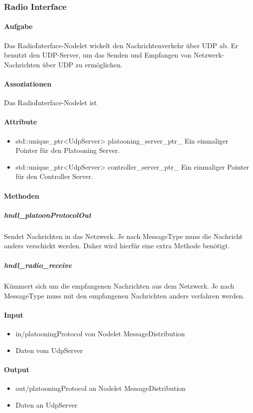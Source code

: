 \documentclass[a4paper, 12pt, titlepage]{scrartcl}
\begin{document}
			\subsubsection{Radio Interface}
			\label{radio_interface}
				\paragraph{Aufgabe} Das RadioInterface-Nodelet wickelt den Nachrichtenverkehr über UDP ab. Er benutzt den UDP-Server, um das Senden und Empfangen von Netzwerk-Nachrichten über UDP zu ermöglichen. 
				\paragraph{Assoziationen} Das RadioInterface-Nodelet ist 
				\paragraph{Attribute}
					\begin{itemize}
					    \item std::unique\_ptr<UdpServer> platooning\_server\_ptr\_ Ein einmaliger Pointer für den Platooning Server. 
					    \item std::unique\_ptr<UdpServer> controller\_server\_ptr\_ Ein einmaliger Pointer für den Controller Server. 
					\end{itemize}
				\paragraph{Methoden}
				    \subparagraph{hndl\_platoonProtocolOut} Sendet Nachrichten in das Netzwerk. Je nach MessageType muss die Nachricht anders verschickt werden. Daher wird hierfür eine extra Methode benötigt. 
					\subparagraph{hndl\_radio\_receive} Kümmert sich um die empfangenen Nachrichten aus dem Netzwerk. Je nach MessageType muss mit den empfangenen Nachrichten anders verfahren werden.
				\paragraph{Input} 
				    \begin{itemize}
				        \item in/platooningProtocol von Nodelet MessageDistribution
				        \item Daten vom UdpServer
				    \end{itemize}
				\paragraph{Output}
				    \begin{itemize}
				        \item out/platooningProtocol an Nodelet MessageDistribution
				        \item Daten an UdpServer
				    \end{itemize}
				
\end{document}
